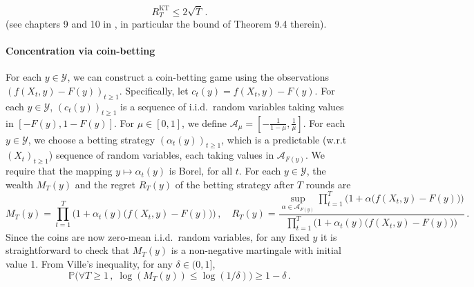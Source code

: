 \documentclass[3p, authoryear, 10pt]{elsarticle}%
\newcommand{\Y}{\mathcal Y}
\begin{document}
\begin{equation}
\label{eq:regret}R_T^\textrm{KT}\leq 2\sqrt{T}\,.
\end{equation} (see chapters 9 and 10 in \citealp{cesabianchi2006prediction}, in particular the bound of Theorem 9.4 therein).

\paragraph{Concentration via coin-betting} 
For each $y \in \Y$, we can construct a coin-betting game using the observations $(f(X_t, y) - F(y))_{t \geq 1}$. Specifically, let $c_t(y) = f(X_t, y) - F(y)$. For each $y \in \Y$, $(c_t(y))_{t \geq 1}$ is a sequence of i.i.d.\ random variables taking values in $[-F(y), 1 - F(y)]$. For $\mu \in [0,1]$, we define $\mathcal{A}_{\mu} = [-\frac1{1-\mu}, \frac1{\mu}]$. For each $y \in \Y$, we choose a betting strategy $(\alpha_t(y))_{t \geq 1}$, which is a predictable (w.r.t $(X_t)_{t \geq 1}$) sequence of random variables, each taking values in $\mathcal{A}_{F(y)}$. We require that the mapping $y\mapsto \alpha_t(y)$ is Borel, for all $t$. For each $y \in \Y$, the wealth $M_T(y)$ and the regret $R_T(y)$ of the betting strategy after $T$ rounds are
\begin{equation*}
M_T(y) = \prod_{t=1}^T \Big(1+\alpha_{t}(y)\big(f(X_t, y)-F(y)\big)\Big)\,, \quad R_T(y) = \frac{\sup_{\alpha \in \mathcal{A}_{F(y)}}\prod_{t=1}^{T}\Big(1+\alpha\big(f(X_t, y)-F(y)\big)\Big)}{\prod_{t=1}^{T}\Big(1+\alpha_{t}(y)\big(f(X_t, y)-F(y)\big)\Big)}\,.
\end{equation*}
Since the coins are now zero-mean i.i.d.\ random variables, for any fixed $y$ it is straightforward to check that $M_T(y)$ is a non-negative martingale with initial value 1. From Ville's inequality, for any $\delta \in (0, 1]$,
\begin{equation}\label{eq:ville}
\mathbb{P}\Big(\forall T \geq 1\,,\;\log(M_T(y)) \leq \log(1/\delta)\Big) \geq 1 - \delta\,.
\end{equation}
\end{document}
